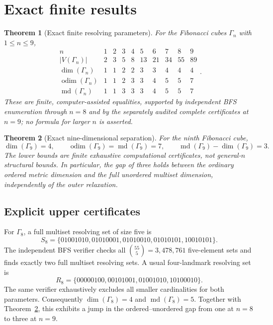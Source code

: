 \documentclass[10pt,a4paper]{article}
\newtheorem{theorem}{Theorem}
\newcommand{\odim}{\operatorname{odim}}
\newcommand{\md}{\operatorname{md}}
\newcommand{\G}{\Gamma}
\begin{document}
\section{Exact finite results}
\begin{theorem}[Exact finite resolving parameters]\label{thm:table}
For the Fibonacci cubes $\G_n$ with $1\le n\le9$,
\[
\begin{array}{c|rrrrrrrrr}
 n&1&2&3&4&5&6&7&8&9\\\hline
 |V(\G_n)|&2&3&5&8&13&21&34&55&89\\
 \dim(\G_n)&1&1&2&2&3&3&4&4&4\\
 \odim(\G_n)&1&1&2&3&3&4&5&5&7\\
 \md(\G_n)&1&1&3&3&3&4&5&5&7
\end{array}.
\]
These are finite, computer-assisted equalities, supported by independent BFS
enumeration through $n=8$ and by the separately audited complete certificates
at $n=9$; no formula for larger $n$ is asserted.
\end{theorem}

\begin{theorem}[Exact nine-dimensional separation]\label{thm:gap}
For the ninth Fibonacci cube,
\[
\dim(\G_9)=4,\qquad
\odim(\G_9)=\md(\G_9)=7,\qquad
\md(\G_9)-\dim(\G_9)=3.
\]
The lower bounds are finite exhaustive computational certificates, not general-$n$ structural bounds.
In particular, the gap of three holds between the ordinary \emph{ordered} metric dimension
and the full \emph{unordered} multiset dimension, independently of the outer relaxation.
\end{theorem}

\subsection{Explicit upper certificates}\label{sec:witness}
For $\G_8$, a full multiset resolving set of size five is
\[
S_8=\{01001010,01010001,01010010,01010101,10010101\}.
\]
The independent BFS verifier checks all $\binom{55}{5}=3{,}478{,}761$
five-element sets and finds exactly two full multiset resolving sets.
A usual four-landmark resolving set is
\[
R_8=\{00000100,00101001,01001010,10100010\}.
\]
The same verifier exhaustively excludes all smaller cardinalities for both
parameters. Consequently $\dim(\G_8)=4$ and $\md(\G_8)=5$.
Together with Theorem~\ref{thm:gap}, this exhibits a jump in the
ordered--unordered gap from one at $n=8$ to three at $n=9$.
\end{document}
